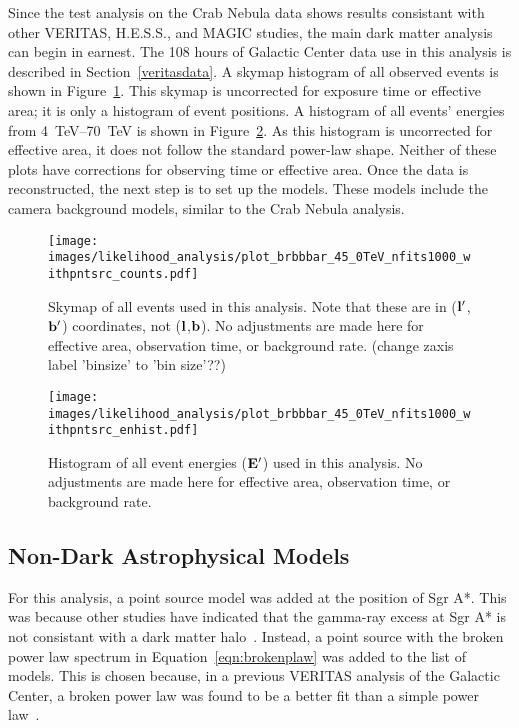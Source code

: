   Since the test analysis on the Crab Nebula data shows results consistant with other VERITAS, H.E.S.S., and MAGIC studies, the main dark matter analysis can begin in earnest.
  The 108 hours of Galactic Center data use in this analysis is described in Section~\ref{veritasdata}.
  A skymap histogram of all observed events is shown in Figure~\ref{fig:gc_counts_skymap}.
  This skymap is uncorrected for exposure time or effective area; it is only a histogram of event positions.
  A histogram of all events' energies from \SIrange{4}{70}{TeV} is shown in Figure~\ref{fig:gc_counts_enhist}.
  As this histogram is uncorrected for effective area, it does not follow the standard power-law shape.
  Neither of these plots have corrections for observing time or effective area.
  Once the data is reconstructed, the next step is to set up the models.
  These models include the camera background models, similar to the Crab Nebula analysis.
  
  \begin{figure}[ht]
    \centering
    \texttt{[image: images/likelihood\_analysis/plot\_brbbbar\_45\_0TeV\_nfits1000\_withpntsrc\_counts.pdf]}
    \caption[Galactic Center Counts Skymap]{
      Skymap of all events used in this analysis.
      Note that these are in ($\mathbf{l'}$,$\mathbf{b'}$) coordinates, not ($\mathbf{l }$,$\mathbf{b }$).
      No adjustments are made here for effective area, observation time, or background rate.
      {\color{red}(change zaxis label 'binsize' to 'bin size'??)}
    }
    \label{fig:gc_counts_skymap}
  \end{figure}
  
  \begin{figure}[h]
    \centering
    \texttt{[image: images/likelihood\_analysis/plot\_brbbbar\_45\_0TeV\_nfits1000\_withpntsrc\_enhist.pdf]}
    \caption[Galactic Center Counts Energy Histogram]{
      Histogram of all event energies ($\mathbf{E'}$) used in this analysis.
      No adjustments are made here for effective area, observation time, or background rate.
    }
    \label{fig:gc_counts_enhist}
  \end{figure}

  \FloatBarrier

  \subsection{Non-Dark Astrophysical Models}\label{subsec:gcpointsrc}
  For this analysis, a point source model was added at the position of Sgr A*.
  This was because other studies have indicated that the gamma-ray excess at Sgr A* is not consistant with a dark matter halo~\cite{gc_pnt_is_not_dm1, gc_pnt_is_not_dm2, gc_pnt_is_not_dm3}.
  Instead, a point source with the broken power law spectrum in Equation~\ref{eqn:brokenplaw} was added to the list of models.
  This is chosen because, in a previous VERITAS analysis of the Galactic Center, a broken power law was found to be a better fit than a simple power law~\cite{VeritasGCRidge2015}.
  
